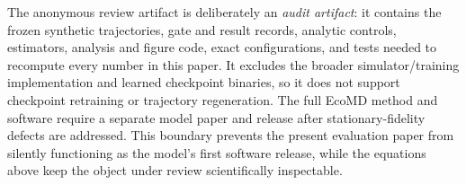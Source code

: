 \documentclass{article}
\begin{document}
The anonymous review artifact is deliberately an \emph{audit artifact}: it contains the frozen
synthetic trajectories, gate and result records, analytic controls, estimators, analysis and figure
code, exact configurations, and tests needed to recompute every number in this paper. It excludes
the broader simulator/training implementation and learned checkpoint binaries, so it does not
support checkpoint retraining or trajectory regeneration. The full EcoMD method and software require
a separate model paper and release after stationary-fidelity defects are addressed. This boundary
prevents the present evaluation paper from silently functioning as the model's first software
release, while the equations above keep the object under review scientifically inspectable.
\end{document}
